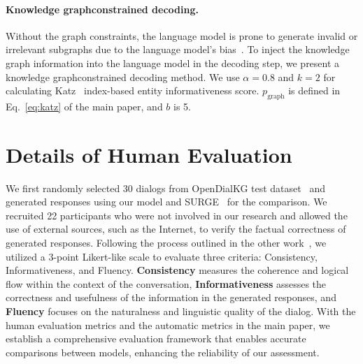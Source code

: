 \paragraph{Knowledge graph{\textendash}constrained decoding.}
Without the graph constraints, the language model is prone to generate invalid or irrelevant subgraphs due to the language model's bias~\cite{chen2022relation,de2021autoregressive}.
To inject the knowledge graph information into the language model in the decoding step, we present a knowledge graph{\textendash}constrained decoding method.
We use $\alpha=0.8$ and $k=2$ for calculating Katz~\cite{katz1953new} index-based entity informativeness score.
$p_{\text{graph}}$ is defined in Eq.~\eqref{eq:katz} of the main paper, and $b$ is 5.


\section{Details of Human Evaluation}
\label{sec:human_evaluation_detail}

We first randomly selected 30 dialogs from OpenDialKG test dataset~\cite{moon2019opendialkg} and generated responses using our model and SURGE~\cite{kang2022knowledge} for the comparison.
We recruited 22 participants who were not involved in our research and allowed the use of external sources, such as the Internet, to verify the factual correctness of generated responses. 
Following the process outlined in the other work~\cite{kang2022knowledge}, we utilized a 3-point Likert-like scale to evaluate three criteria: Consistency, Informativeness, and Fluency. 
\textbf{Consistency} measures the coherence and logical flow within the context of the conversation, \textbf{Informativeness} assesses the correctness and usefulness of the information in the generated responses, and \textbf{Fluency} focuses on the naturalness and linguistic quality of the dialog. 
With the human evaluation metrics and the automatic metrics in the main paper, we establish a comprehensive evaluation framework that enables accurate comparisons between models, enhancing the reliability of our assessment.



